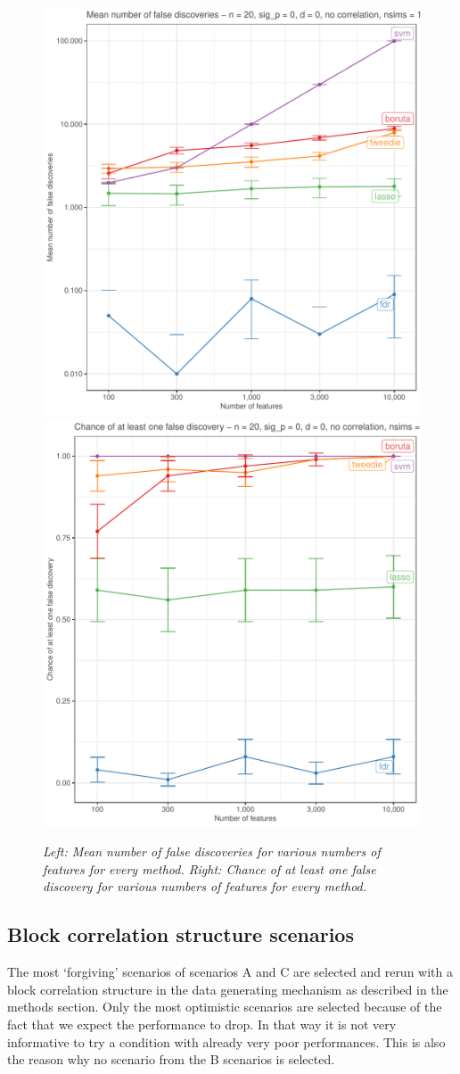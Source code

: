 \documentclass[
]{article}
\begin{document}
\begin{figure}

{\centering \includegraphics[width=0.49\linewidth]{main_files/figure-latex/D-1} \includegraphics[width=0.49\linewidth]{main_files/figure-latex/D-2} 

}

\caption{\textit{Left: Mean number of false discoveries for various numbers of features for every method. Right: Chance of at least one false discovery for various numbers of features for every method.}}\label{fig:D}
\end{figure}

\hypertarget{block-correlation-structure-scenarios}{%
\subsection{Block correlation structure scenarios}\label{block-correlation-structure-scenarios}}

The most `forgiving' scenarios of scenarios A and C are selected and rerun with a block correlation structure in the data generating mechanism as described in the methods section. Only the most optimistic scenarios are selected because of the fact that we expect the performance to drop. In that way it is not very informative to try a condition with already very poor performances. This is also the reason why no scenario from the B scenarios is selected.
\end{document}
